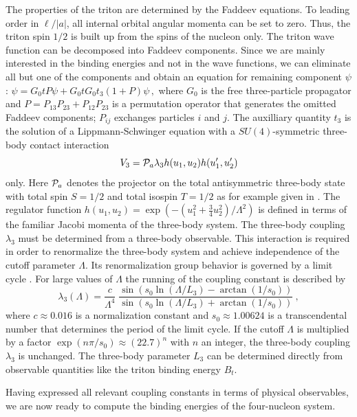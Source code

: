 \documentclass[prc,preprint,tightenlines,showpacs]{revtex4}
\newcommand{\beq}{\begin{equation}}
\newcommand{\eeq}{\end{equation}}
\begin{document}
The properties of the triton are determined by the Faddeev
equations. %
To leading order in $\ell/|a|$, all internal orbital angular 
momenta can be set to zero. Thus, the triton spin $1/2$ is built 
up from the spins of the nucleon only.
The triton wave function can be decomposed into Faddeev components.
Since we are mainly interested in the binding energies and not in the
wave functions, we can eliminate all but one of the components and obtain
an equation for remaining component $\psi$ :
$
\psi=G_0 t P \psi+G_0 t G_0 t_3 (1+P)\psi\,,
$
where $G_0$ is the free three-particle propagator and
$P=P_{13}P_{23}+P_{12}P_{23}$ is a permutation operator that 
generates the omitted Faddeev components; $P_{ij}$ exchanges
particles $i$ and $j$. The auxilliary quantity
$t_3$ is the solution of a Lippmann-Schwinger equation with 
a $SU(4)$-symmetric three-body contact interaction 
\beq
V_3={\cal P}_a \lambda_3 h(u_1,u_2) h(u'_1,u'_2)
\eeq
only. Here ${\cal P}_a$ denotes the projector on the total antisymmetric 
three-body state with total spin $S=1/2$ and total isospin $T=1/2$
as for example given in \cite{Delfino:1984}.
The regulator function $h(u_1,u_2)=\exp(-(u_1^2+{\textstyle \frac{3}{4}}u_2^2)/
\Lambda^2)$ is defined in terms of the familiar Jacobi momenta
of the three-body system. 
The three-body coupling $\lambda_3$ must be determined from a three-body
observable. This interaction is required in order to renormalize the 
three-body system and achieve independence of the cutoff
parameter $\Lambda$.
Its renormalization group behavior is governed
by a limit cycle \cite{Bedaque:1999ve,Platter:2004qn}.
For large values of $\Lambda$ the running of the coupling
constant is described by
\beq
\lambda_3(\Lambda)=\frac{c}{\Lambda^4} \;\frac{\sin(s_0 \ln(\Lambda/L_3)
  -\arctan(1/s_0))}{\sin(s_0 \ln(\Lambda/L_3)+\arctan(1/s_0))}~,
\label{eq:limcyc}
\eeq
where $c\approx 0.016$ is a normalization constant and
$s_0\approx 1.00624$ is a transcendental number that determines the
period of the limit cycle. If the cutoff $\Lambda$ is multiplied by 
a factor $\exp(n\pi/s_0) \approx (22.7)^n$ with $n$ an integer, the 
three-body coupling $\lambda_3$ is unchanged.
The three-body parameter $L_3$ can be determined directly from observable 
quantities like the triton binding energy $B_t$. 

Having expressed all relevant coupling constants in terms of 
physical observables, we are now ready to compute the binding
energies of the four-nucleon system. 
\end{document}
